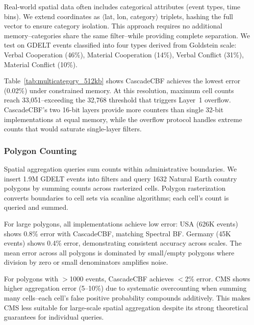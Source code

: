 \documentclass[agile, final]{copernicus-agile}
\begin{document}
Real-world spatial data often includes categorical attributes (event types, time bins). We extend coordinates as $\langle$lat, lon, category$\rangle$ triplets, hashing the full vector to ensure category isolation. This approach requires no additional memory--categories share the same filter--while providing complete separation. We test on GDELT events classified into four types derived from Goldstein scale: Verbal Cooperation (46\%), Material Cooperation (14\%), Verbal Conflict (31\%), Material Conflict (10\%).



Table~\ref{tab:multicategory_512kb} shows CascadeCBF achieves the lowest error (0.02\%) under constrained memory. At this resolution, maximum cell counts reach 33,051--exceeding the 32,768 threshold that triggers Layer~1 overflow. CascadeCBF's two 16-bit layers provide more counters than single 32-bit implementations at equal memory, while the overflow protocol handles extreme counts that would saturate single-layer filters.


\subsubsection{Polygon Counting}

Spatial aggregation queries sum counts within administrative boundaries. We insert 1.9M GDELT events into filters and query 1632 Natural Earth country polygons by summing counts across rasterized cells. Polygon rasterization converts boundaries to cell sets via scanline algorithms; each cell's count is queried and summed.

For large polygons, all implementations achieve low error: USA (626K events) shows 0.8\% error with CascadeCBF, matching Spectral BF. Germany (45K events) shows 0.4\% error, demonstrating consistent accuracy across scales. The mean error across all polygons is dominated by small/empty polygons where division by zero or small denominators amplifies noise.

For polygons with $>$1000 events, CascadeCBF achieves $<$2\% error. CMS shows higher aggregation error (5--10\%) due to systematic overcounting when summing many cells--each cell's false positive probability compounds additively. This makes CMS less suitable for large-scale spatial aggregation despite its strong theoretical guarantees for individual queries.
\end{document}
